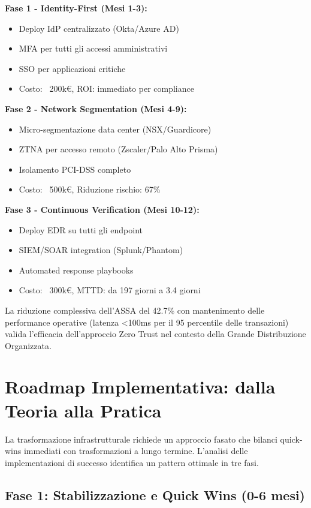 \textbf{Fase 1 - Identity-First (Mesi 1-3):}
\begin{itemize}
    \item Deploy IdP centralizzato (Okta/Azure AD)
    \item MFA per tutti gli accessi amministrativi
    \item SSO per applicazioni critiche
    \item Costo: ~200k€, ROI: immediato per compliance
\end{itemize}

\textbf{Fase 2 - Network Segmentation (Mesi 4-9):}
\begin{itemize}
    \item Micro-segmentazione data center (NSX/Guardicore)
    \item ZTNA per accesso remoto (Zscaler/Palo Alto Prisma)
    \item Isolamento PCI-DSS completo
    \item Costo: ~500k€, Riduzione rischio: 67\%
\end{itemize}

\textbf{Fase 3 - Continuous Verification (Mesi 10-12):}
\begin{itemize}
    \item Deploy EDR su tutti gli endpoint
    \item SIEM/SOAR integration (Splunk/Phantom)
    \item Automated response playbooks
    \item Costo: ~300k€, MTTD: da 197 giorni a 3.4 giorni
\end{itemize}

La riduzione complessiva dell'ASSA del 42.7\% con mantenimento delle performance operative (latenza <100ms per il 95 percentile delle transazioni) valida l'efficacia dell'approccio Zero Trust nel contesto della Grande Distribuzione Organizzata.

\section{Roadmap Implementativa: dalla Teoria alla Pratica}

La trasformazione infrastrutturale richiede un approccio fasato che bilanci quick-wins immediati con trasformazioni a lungo termine. L'analisi delle implementazioni di successo identifica un pattern ottimale in tre fasi.

\subsection{Fase 1: Stabilizzazione e Quick Wins (0-6 mesi)}

